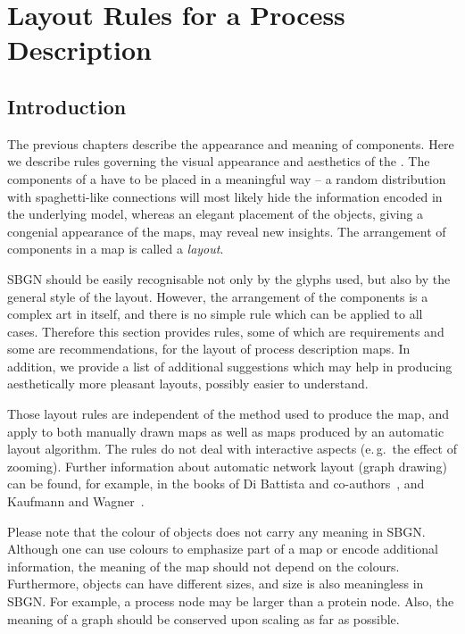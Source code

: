 \chapter{Layout Rules for a Process Description}
\label{chp:layout}

\section{Introduction}
\label{sec:layout-intro}

The previous chapters describe the appearance and meaning of \SBGNPDLone components. Here we describe rules governing the visual appearance and aesthetics of the \PDl. The components of a \PD have to be placed in a meaningful way -- a random distribution with spaghetti-like connections will most likely hide the information encoded in the underlying model, whereas an elegant placement of the objects, giving a congenial appearance of the maps, may reveal new insights. The arrangement of components in a map is called a \emph{layout}.

SBGN \PDs should be easily recognisable not only by the
glyphs used, but also by the general style of the layout. However, the
arrangement of the components is a complex art in itself, and there is
no simple rule which can be applied to all cases. Therefore this
section provides rules, some of which are requirements and some are recommendations, for the layout of process description maps.
In addition, we provide a list of additional suggestions which may help in producing aesthetically more pleasant layouts, possibly easier to understand.

Those layout rules are independent of the method used to produce
the map, and apply to both manually drawn maps as well as
maps produced by an automatic layout algorithm. The rules do
not deal with interactive aspects (e.\,g.~the effect of zooming). Further information about automatic network layout
(graph drawing) can be found, for example, in the books of Di Battista and
co-authors~\cite{DiBattista:1998}, and Kaufmann and Wagner~\cite{Kaufmann:2001}.

Please note that the colour of objects does not carry any meaning in
SBGN. Although one can use colours to emphasize part of a map or
encode additional information, the meaning of the map should not
depend on the colours. Furthermore, objects can have different sizes,
and size is also meaningless in SBGN. For example, a process node
may be larger than a protein node. Also, the meaning of a graph
should be conserved upon scaling as far as possible.

